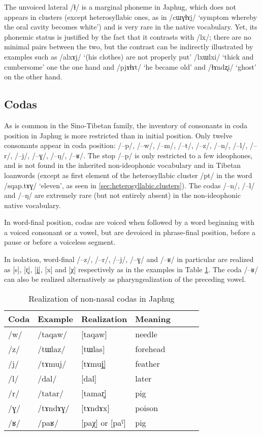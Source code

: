 \documentclass[oldfontcommands,oneside,a4paper,11pt]{article}
\newcommand{\ipa}[1]{/#1/} %
\begin{document}
The unvoiced lateral  \ipa{ɬ} is a marginal phoneme in Japhug, which does not appears in clusters (except heterosyllabic ones, as in \ipa{cɯɣɬɤj} `symptom whereby the oral cavity becomes white') and is very rare in the native vocabulary. Yet, its phonemic status is justified by the fact that it contrasts with \ipa{lx}; there are no minimal pairs between the two, but the contrast can be indirectly illustrated by examples such as \ipa{alxɤj} `(his clothes) are not properly put' \ipa{lxɯlxi} `thick and cumbersome' one the one hand and \ipa{pjɤɬɤt} `he became old' and \ipa{ɬɤndʐi} `ghost' on the other hand.





      \subsection{Codas} \label{sec:coda}
   As is common in the Sino-Tibetan family, the inventory of consonants in coda position in Japhug is more restricted than in initial position.  Only twelve   consonants appear in coda position:  \ipa{--p}, \ipa{--w}, \ipa{--m}, \ipa{--t}, \ipa{--z}, \ipa{--n}, \ipa{--l}, \ipa{--r}, \ipa{--j}, \ipa{--ɣ}, \ipa{--ŋ}, \ipa{--ʁ}. The stop \ipa{--p} is only restricted to a few ideophones, and is not found in the inherited non-ideophonic vocabulary and in Tibetan loanwords (except as first element of the heterosyllabic cluster \ipa{pt} in the word \ipa{sqap.tɤɣ} `eleven', as seen in \ref{sec:heterosyllabic.clusters}). The codas \ipa{--n}, \ipa{--l} and \ipa{--ŋ} are extremely rare (but not entirely absent) in the non-ideophonic native vocabulary. 
    
In word-final position, codas are voiced when followed by a word beginning with a voiced consonant or a vowel, but are devoiced in phrase-final position, before a pause or before a voiceless segment.

In isolation, word-final \ipa{--z}, \ipa{--r}, \ipa{--j}, \ipa{--ɣ} and \ipa{--ʁ} in particular are realized as [s], [r̥], [j̥], [x] and [χ] respectively as in the examples in Table \ref{tab:codas}. The coda \ipa{--ʁ} can also be realized alternatively as pharyngealization of the preceding vowel.

\begin{table}
 \caption{Realization of non-nasal  codas in Japhug} \label{tab:codas}  \centering
\begin{tabular}{lllllll}
\toprule
Coda & Example & Realization &Meaning\\
\midrule
\ipa{w} & \ipa{taqaw} &[taqaw] &needle\\
\ipa{z} & \ipa{tɯlaz} &[tɯlas] &forehead\\
\ipa{j} & \ipa{tɤmuj} &[tɤmuj̥] &feather\\
\ipa{l} & \ipa{dal} &[dal] &later\\
\ipa{r} & \ipa{tatar} &[tamar̥] &pig\\
\ipa{ɣ} & \ipa{tɤndɤɣ} &[tɤndɤx] &poison\\
\ipa{ʁ} & \ipa{paʁ} & [paχ] or [paˁ] &pig\\
\bottomrule
\end{tabular}
\end{table}
    
\end{document}
